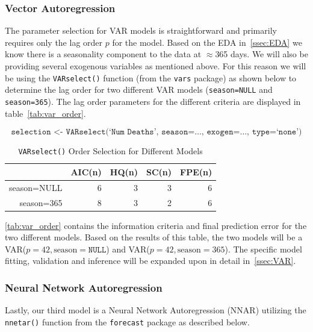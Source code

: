 \documentclass{article}\usepackage[]{graphicx}\usepackage[]{color}
\begin{document}
\subsubsection{Vector Autoregression}

The parameter selection for VAR models is straightforward and primarily requires only the lag order $p$ for the model. Based on the EDA in~\autoref{ssec:EDA} we know there is a seasonality component to the data at $\approx$365 days. We will also be providing several exogenous variables as mentioned above. For this reason we will be using the \texttt{VARselect()} function (from the \texttt{vars} package) as shown below to determine the lag order for two different VAR models (\texttt{season=NULL} and \texttt{season=365}). The lag order parameters for the different criteria are displayed in table~\autoref{tab:var_order}.

\begin{equation*}
    \texttt{selection <- VARselect(`Num Deaths', season=\ldots, exogen=\ldots, type=`none')}
\end{equation*}

\begin{table}[H]
\centering
\begin{tabular}{rrrrr}
  \hline
 & AIC(n) & HQ(n) & SC(n) & FPE(n) \\ 
  \hline
season=NULL &   6 &   3 &   3 &   6 \\ 
  season=365 &   8 &   3 &   2 &   6 \\ 
   \hline
\end{tabular}
\caption{\texttt{VARselect()} Order Selection for Different Models} 
\label{tab:var_order}
\end{table}


\autoref{tab:var_order} contains the information criteria and final prediction error for the two different models. Based on the results of this table, the two models will be a VAR($p=42, \text{season}=\mathtt{NULL}$) and VAR($p=42, \text{season}=365$). The specific model fitting, validation and inference will be expanded upon in detail in~\autoref{ssec:VAR}.

\subsubsection{Neural Network Autoregression}

Lastly, our third model is a Neural Network Autoregression (NNAR) utilizing the \texttt{nnetar()} function from the \texttt{forecast} package as described below.
\end{document}
